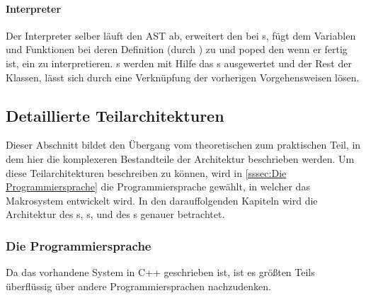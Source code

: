       \paragraph{Interpreter}
        Der Interpreter selber läuft den AST ab, erweitert den  bei s, fügt dem  Variablen und Funktionen bei deren Definition (durch ) zu und poped den  wenn er fertig ist, ein  zu interpretieren. s werden mit Hilfe das s ausgewertet und der Rest der  Klassen, lässt sich durch eine Verknüpfung der vorherigen Vorgehensweisen lösen.

  \subsection{Detaillierte Teilarchitekturen}
  \label{ssec:Detaillierte Teilarchitekturen}
    Dieser Abschnitt bildet den Übergang vom theoretischen zum praktischen Teil, in dem hier die komplexeren Bestandteile der Architektur beschrieben werden. Um diese Teilarchitekturen beschreiben zu können, wird in \autoref{sssec:Die Programmiersprache} die Programmiersprache gewählt, in welcher das Makrosystem entwickelt wird. In den darauffolgenden Kapiteln wird die Architektur des s, s,  und des s genauer betrachtet.

    \subsubsection{Die Programmiersprache}
    \label{sssec:Die Programmiersprache}
      Da das vorhandene System in C++ geschrieben ist, ist es größten Teils überflüssig über andere Programmiersprachen nachzudenken.

